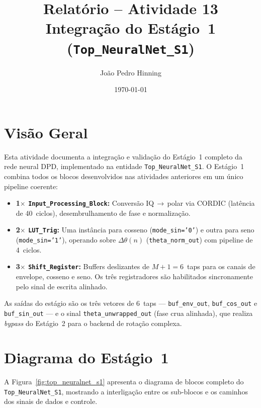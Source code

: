 \documentclass[a4paper,12pt]{article}
\title{Relat\'orio -- Atividade 13 \\
       \large Integra\c{c}\~ao do Est\'agio~1 (\texttt{Top\_NeuralNet\_S1})}
\author{Jo\~ao Pedro Hinning}
\date{\today}
\begin{document}
\maketitle
\thispagestyle{fancy}

\section{Vis\~ao Geral}

Esta atividade documenta a integra\c{c}\~ao e valida\c{c}\~ao do Est\'agio~1 completo da rede
neural DPD, implementado na entidade \texttt{Top\_NeuralNet\_S1}. O Est\'agio~1 combina todos
os blocos desenvolvidos nas atividades anteriores em um \'unico pipeline coerente:

\begin{itemize}
    \item \textbf{1$\times$ \texttt{Input\_Processing\_Block}:} Convers\~ao IQ$\,\rightarrow\,$polar
          via CORDIC (lat\^encia de 40~ciclos), desembrulhamento de fase e normaliza\c{c}\~ao.
    \item \textbf{2$\times$ \texttt{LUT\_Trig}:} Uma inst\^ancia para cosseno (\texttt{mode\_sin='0'})
          e outra para seno (\texttt{mode\_sin='1'}), operando sobre $\Delta\theta(n)$
          (\texttt{theta\_norm\_out}) com pipeline de 4~ciclos.
    \item \textbf{3$\times$ \texttt{Shift\_Register}:} Buffers deslizantes de $M+1 = 6$~taps
          para os canais de envelope, cosseno e seno. Os tr\^es registradores s\~ao habilitados
          sincronamente pelo sinal de escrita alinhado.
\end{itemize}

As sa\'idas do est\'agio s\~ao os tr\^es vetores de 6~taps ---
\texttt{buf\_env\_out}, \texttt{buf\_cos\_out} e \texttt{buf\_sin\_out} --- e o sinal
\texttt{theta\_unwrapped\_out} (fase crua alinhada), que realiza \textit{bypass} do Est\'agio~2
para o backend de rota\c{c}\~ao complexa.


\section{Diagrama do Est\'agio~1}

A Figura~\ref{fig:top_neuralnet_s1} apresenta o diagrama de blocos completo do \texttt{Top\_NeuralNet\_S1},
mostrando a interliga\c{c}\~ao entre os sub-blocos e os caminhos dos sinais de dados e controle.
\end{document}
